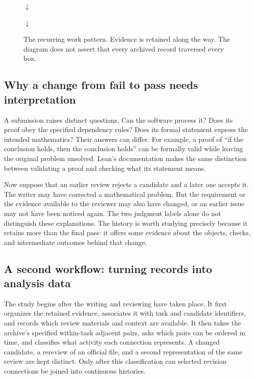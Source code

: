\begin{figure}[htbp]
\centering\small
{}
\par\smallskip $\downarrow$ \par\smallskip
{}
\par\smallskip $\downarrow$ \par\smallskip
{}
\caption{The recurring work pattern. Evidence is retained along the way. The diagram does not assert that every archived record traversed every box.}
\label{fig:work-pattern}
\end{figure}

\subsection{Why a change from fail to pass needs interpretation}
A submission raises distinct questions. Can the software process it? Does its proof obey the specified dependency rules? Does its formal statement express the intended mathematics? Their answers can differ. For example, a proof of ``if the conclusion holds, then the conclusion holds'' can be formally valid while leaving the original problem unsolved. Lean's documentation makes the same distinction between validating a proof and checking what its statement means\cite{leanvalidation}.

Now suppose that an earlier review rejects a candidate and a later one accepts it. The writer may have corrected a mathematical problem. But the requirement or the evidence available to the reviewer may also have changed, or an earlier issue may not have been noticed again. The two judgment labels alone do not distinguish these explanations. The history is worth studying precisely because it retains more than the final pass: it offers some evidence about the objects, checks, and intermediate outcomes behind that change.

\subsection{A second workflow: turning records into analysis data}
\label{subsec:analysis-workflow}
The study begins after the writing and reviewing have taken place. It first organizes the retained evidence, associates it with task and candidate identifiers, and records which review materials and context are available. It then takes the archive's specified within-task adjacent pairs, asks which pairs can be ordered in time, and classifies what activity each connection represents. A changed candidate, a rereview of an official file, and a second representation of the same review are kept distinct. Only after this classification can selected revision connections be joined into continuous histories.

